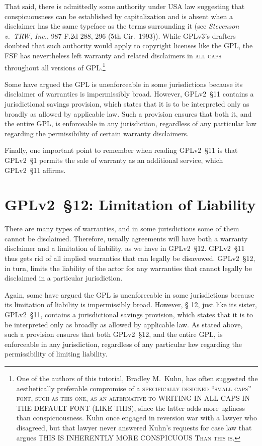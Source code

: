 That said, there is admittedly some authority under USA law suggesting that
conspicuousness can be established by
capitalization and is absent when a disclaimer has the same typeface as the
terms surrounding it (see \textit{Stevenson v.~TRW, Inc.}, 987 F.2d 288, 296
(5th Cir.~1993)).  While GPLv3's drafters doubted that such authority would
apply to copyright licenses like the GPL, the FSF has nevertheless left
warranty and related disclaimers in \textsc{all caps} throughout all versions
of GPL\@.\footnote{One of the authors of this tutorial, Bradley M.~Kuhn, has
  often suggested the aesthetically preferable compromise of a
  \textsc{specifically designed ``small caps'' font, such as this one, as an
    alternative to} WRITING IN ALL CAPS IN THE DEFAULT FONT (LIKE THIS),
  since the latter adds more ugliness than conspicuousness.  Kuhn once
  engaged in reversion war with a lawyer who disagreed, but that lawyer never
  answered Kuhn's requests for case law that argues THIS IS INHERENTLY MORE
  CONSPICUOUS \textsc{Than this is}.}

Some have argued the GPL is unenforceable in some jurisdictions because
its disclaimer of warranties is impermissibly broad.  However, GPLv2~\S11
contains a jurisdictional savings provision, which states that it is to be
interpreted only as broadly as allowed by applicable law.  Such a
provision ensures that both it, and the entire GPL, is enforceable in any
jurisdiction, regardless of any particular law regarding the
permissibility of certain warranty disclaimers.

Finally, one important point to remember when reading GPLv2~\S11 is that GPLv2~\S1
permits the sale of warranty as an additional service, which GPLv2~\S11 affirms.

\section{GPLv2~\S12: Limitation of Liability}
\label{GPLv2s12}

There are many types of warranties, and in some jurisdictions some of them
cannot be disclaimed.  Therefore, usually agreements will have both a
warranty disclaimer and a limitation of liability, as we have in GPLv2~\S12.
GPLv2~\S11 thus gets rid of all implied warranties that can legally be
disavowed. GPLv2~\S12, in turn, limits the liability of the actor for any
warranties that cannot legally be disclaimed in a particular jurisdiction.

Again, some have argued the GPL is unenforceable in some jurisdictions
because its limitation of liability is impermissibly broad. However, \S
12, just like its sister, GPLv2~\S11, contains a jurisdictional savings
provision, which states that it is to be interpreted only as broadly as
allowed by applicable law.  As stated above, such a provision ensures that
both GPLv2~\S12, and the entire GPL, is enforceable in any jurisdiction,
regardless of any particular law regarding the permissibility of limiting
liability.

